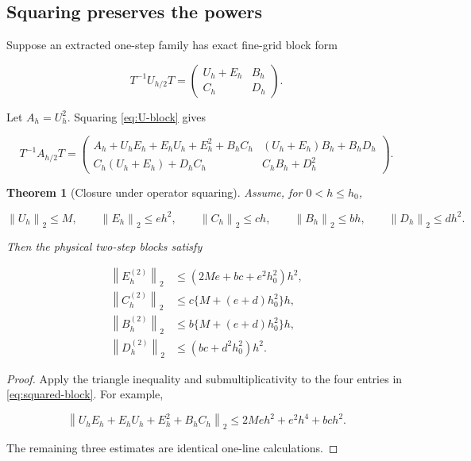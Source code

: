 \documentclass[11pt]{article}
\newtheorem{theorem}{Theorem}[section]
\theoremstyle{definition}
\theoremstyle{remark}
\newcommand{\norm}[1]{\left\lVert #1\right\rVert}
\begin{document}
\subsection{Squaring preserves the powers}

Suppose an extracted one-step family has exact fine-grid block form

\begin{equation}
T^{-1}U_{h/2}T=
\begin{pmatrix}
U_h+E_h&B_h\\
C_h&D_h
\end{pmatrix}.
\label{eq:U-block}
\end{equation}

Let $A_h=U_h^2$.  Squaring \eqref{eq:U-block} gives

\begin{equation}
T^{-1}A_{h/2}T=
\begin{pmatrix}
A_h+U_hE_h+E_hU_h+E_h^2+B_hC_h
&(U_h+E_h)B_h+B_hD_h\\
C_h(U_h+E_h)+D_hC_h
&C_hB_h+D_h^2
\end{pmatrix}.
\label{eq:squared-block}
\end{equation}

\begin{theorem}[Closure under operator squaring]
\label{thm:squaring}
Assume, for $0<h\le h_0$,

\[
\norm{U_h}_2\le M,\qquad
\norm{E_h}_2\le e h^2,\qquad
\norm{C_h}_2\le c h,\qquad
\norm{B_h}_2\le b h,\qquad
\norm{D_h}_2\le d h^2.
\]

Then the physical two-step blocks satisfy

\begin{align}
\norm{E_h^{(2)}}_2
&\le(2Me+bc+e^2h_0^2)h^2,
\label{eq:square-E}\\
\norm{C_h^{(2)}}_2
&\le c\{M+(e+d)h_0^2\}h,
\label{eq:square-C}\\
\norm{B_h^{(2)}}_2
&\le b\{M+(e+d)h_0^2\}h,
\label{eq:square-B}\\
\norm{D_h^{(2)}}_2
&\le(bc+d^2h_0^2)h^2.
\label{eq:square-D}
\end{align}
\end{theorem}

\begin{proof}
Apply the triangle inequality and submultiplicativity to the four entries in
\eqref{eq:squared-block}.  For example,

\[
\norm{U_hE_h+E_hU_h+E_h^2+B_hC_h}_2
\le2Meh^2+e^2h^4+bch^2.
\]

The remaining three estimates are identical one-line calculations.
\end{proof}
\end{document}
